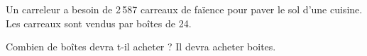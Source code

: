 Un carreleur a besoin de 2\,587 carreaux de faïence pour paver le sol d'une cuisine. Les carreaux sont vendus par boîtes de 24.

Combien de boîtes devra t-il acheter ?
\kern2cm Il devra acheter  boites.